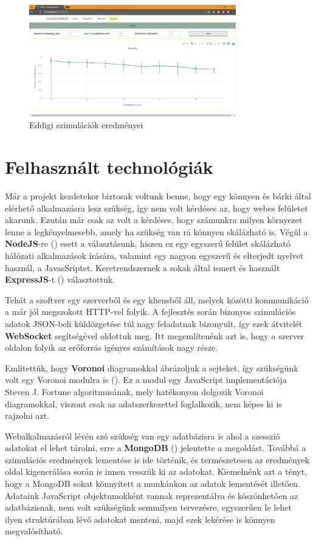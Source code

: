 \begin{figure}[ht!]
	\centering
	\includegraphics[width=90mm]{images/SimulationResults}
	\vspace*{1mm}
	\caption{Eddigi szimulációk eredményei}
	\label{fig:SimulationResults}
\end{figure}


\section{Felhasznált technológiák}

Már a projekt kezdetekor biztosak voltunk benne, hogy egy könnyen és bárki által elérhető alkalmazásra lesz szükség, így nem volt kérdéses az, hogy webes felületet akarunk. Ezután már csak az volt a kérdéses, hogy számunkra milyen környezet lenne a legkényelmesebb, amely ha szükség van rá könnyen skálázható is. Végül a \textbf{NodeJS}-re (\cite{soft:node}) esett a választásunk, hiszen ez egy egyszerű felület skálázható hálózati alkalmazások írására, valamint egy nagyon egyszerű és elterjedt nyelvet használ, a JavasSriptet. Keretrendszernek a sokak által ismert és használt \textbf{ExpressJS}-t (\cite{soft:express}) választottuk.

Tehát a szoftver egy szerverből és egy kliensből áll, melyek közötti kommunikáció a már jól megszokott HTTP-vel folyik. A fejlesztés során bizonyos szimulációs adatok JSON-beli küldözgetése túl nagy feladatnak bizonyult, így ezek átvitelét \textbf{WebSocket} segítségével oldottuk meg. Itt megemlítenénk azt is, hogy a szerver oldalon folyik az erőforrás igényes számítások nagy része.

Említettük, hogy \textbf{Voronoi} diagramokkal ábrázoljuk a sejteket, így szükségünk volt egy Voronoi modulra is (\cite{soft:voronoiModule}). Ez a modul egy JavaScript implementációja Steven J. Fortune algoritmusának, mely hatékonyon dolgozik Voronoi diagramokkal, viszont csak az adatszerkezettel foglalkozik, nem képes ki is rajzolni azt.

Webalkalmazásról lévén szó szükség van egy adatbázisra is ahol a szesszió adatokat el lehet tárolni, erre a \textbf{MongoDB} (\cite{soft:mongodb}) jelentette a megoldást. Továbbá a szimulációs eredmények lementése is ide történik, és természetesen az eredmények oldal kigenerálása során is innen vesszük ki az adatokat. Kiemelnénk azt a tényt, hogy a MongoDB sokat könnyített a munkánkon az adatok lementését illetően. Adataink JavaScript objektumokként vannak reprezentálva és köszönhetően az adatbázisnak, nem volt szükségünk semmilyen tervezésre, egyszerűen le lehet ilyen struktúrában lévő adatokat menteni, majd ezek lekérése is könnyen megvalósítható.

